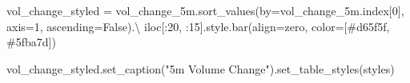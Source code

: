 \documentclass[
  letterpaper,
  DIV=11,
  numbers=noendperiod]{scrartcl}
\newenvironment{Shaded}{\begin{snugshade}}{\end{snugshade}}
\newcommand{\DecValTok}[1]{\textcolor[rgb]{0.68,0.00,0.00}{#1}}
\newcommand{\NormalTok}[1]{\textcolor[rgb]{0.00,0.23,0.31}{#1}}
\newcommand{\OperatorTok}[1]{\textcolor[rgb]{0.37,0.37,0.37}{#1}}
\newcommand{\StringTok}[1]{\textcolor[rgb]{0.13,0.47,0.30}{#1}}
\newcommand{\VariableTok}[1]{\textcolor[rgb]{0.07,0.07,0.07}{#1}}
\begin{document}
\begin{Shaded}
\begin{Highlighting}[]
\NormalTok{vol\_change\_styled }\OperatorTok{=}\NormalTok{ vol\_change\_5m.sort\_values(by}\OperatorTok{=}\NormalTok{vol\_change\_5m.index[}\DecValTok{0}\NormalTok{], axis}\OperatorTok{=}\DecValTok{1}\NormalTok{, ascending}\OperatorTok{=}\VariableTok{False}\NormalTok{).}\OperatorTok{\textbackslash{}}
\NormalTok{    iloc[:}\DecValTok{20}\NormalTok{, :}\DecValTok{15}\NormalTok{].style.bar(align}\OperatorTok{=}\StringTok{\textquotesingle{}zero\textquotesingle{}}\NormalTok{, color}\OperatorTok{=}\NormalTok{[}\StringTok{\textquotesingle{}\#d65f5f\textquotesingle{}}\NormalTok{, }\StringTok{\textquotesingle{}\#5fba7d\textquotesingle{}}\NormalTok{])}

\NormalTok{vol\_change\_styled.set\_caption(}\StringTok{"5m Volume Change"}\NormalTok{).set\_table\_styles(styles)}
\end{Highlighting}
\end{Shaded}
\end{document}

